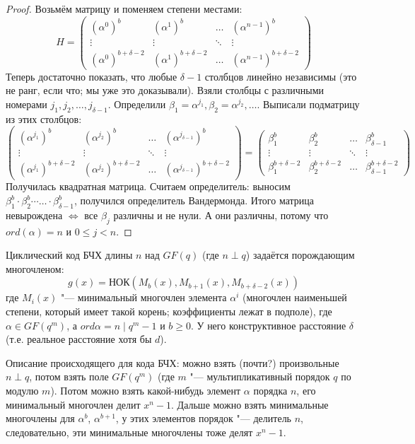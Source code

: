 \begin{proof}
	Возьмём матрицу и поменяем степени местами:
	\[
		H=
		\begin{pmatrix}
			(\alpha^0)^b & (\alpha^1)^b & \dots & (\alpha^{n-1})^b \\
			\vdots & \vdots & \ddots & \vdots \\
			(\alpha^0)^{b+\delta-2} & (\alpha^1)^{b+\delta-2} & \dots & (\alpha^{n-1})^{b+\delta-2}
		\end{pmatrix}
	\]
	Теперь достаточно показать, что любые $\delta-1$ столбцов линейно независимы
	(это не ранг, если что; мы уже это доказывали).
	Взяли столбцы с различными номерами $j_1, j_2, \dots, j_{\delta-1}$.
	Определили $\beta_1=\alpha^{j_1}, \beta_2=\alpha^{j_2}, \dots$.
	Выписали подматрицу из этих столбцов:
	\[
		\begin{pmatrix}
		(\alpha^{j_1})^b & (\alpha^{j_2})^b & \dots & (\alpha^{j_{\delta-1}})^b \\
		\vdots & \vdots & \ddots & \vdots \\
		(\alpha^{j_1})^{b+\delta-2} & (\alpha^{j_2})^{b+\delta-2} & \dots & (\alpha^{j_{\delta-1}})^{b+\delta-2}
		\end{pmatrix}
		=
		\begin{pmatrix}
		\beta_1^b & \beta_2^b & \dots & \beta_{\delta-1}^b \\
		\vdots & \vdots & \ddots & \vdots \\
		\beta_1^{b+\delta-2} & \beta_2^{b+\delta-2} & \dots & \beta_{\delta-1}^{b+\delta-2}
		\end{pmatrix}
	\]
	Получилась квадратная матрица.
	Считаем определитель: выносим $\beta_1^b \cdot \beta_2^b \cdots \dots \cdot \beta_{\delta-1}^b$,
	получился определитель Вандермонда.
	Итого матрица невырождена $\iff$ все $\beta_j$ различны и не нули.
	А они различны, потому что $ord(\alpha)=n$ и $0 \le j < n$.
\end{proof}

\begin{Def}
	Циклический код БЧХ длины $n$ над $GF(q)$ (где $n \perp q$)
	задаётся порождающим многочленом:
	\[
	g(x) = НОК(M_b(x), M_{b+1}(x), M_{b+\delta-2}(x))
	\]
	где $M_i(x)$ "--- минимальный многочлен элемента $\alpha^i$
	(многочлен наименьшей степени, который имеет такой корень; коэффициенты лежат в подполе),
	где $\alpha \in GF(q^m)$, а $ord \alpha = n \mid q^m-1$
	и $b \ge 0$.
	У него конструктивное расстояние $\delta$ (т.е. реальное расстояние хотя бы $d$).
\end{Def}

Описание происходящего для кода БЧХ:
можно взять (почти?) произвольные $n \perp q$,
потом взять поле $GF(q^m)$ (где $m$ "--- мультипликативный порядок $q$ по модулю $m$).
Потом можно взять какой-нибудь элемент $\alpha$ порядка $n$,
его минимальный многочлен делит $x^n-1$.
Дальше можно взять минимальные многочлены для $\alpha^b$, $\alpha^{b+1}$,
у этих элементов порядок "--- делитель $n$, следовательно,
эти минимальные многочлены тоже делят $x^n-1$.

